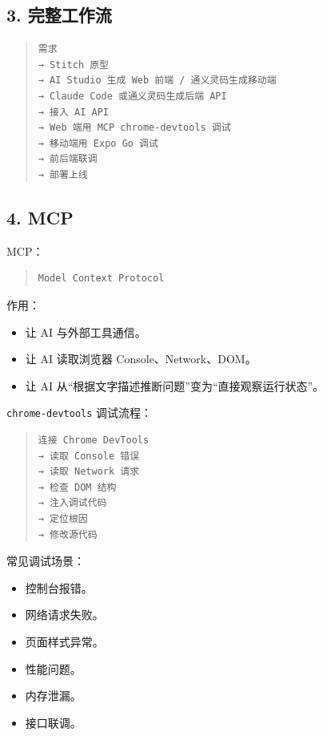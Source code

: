 \documentclass[UTF8,zihao=-4]{ctexart}
\begin{document}
\subsection{3. 完整工作流}

\begin{quote}
\footnotesize
\begin{verbatim}
需求
→ Stitch 原型
→ AI Studio 生成 Web 前端 / 通义灵码生成移动端
→ Claude Code 或通义灵码生成后端 API
→ 接入 AI API
→ Web 端用 MCP chrome-devtools 调试
→ 移动端用 Expo Go 调试
→ 前后端联调
→ 部署上线
\end{verbatim}
\end{quote}

\subsection{4. MCP}

MCP：

\begin{quote}
\footnotesize
\begin{verbatim}
Model Context Protocol
\end{verbatim}
\end{quote}

作用：

\begin{itemize}
\item 让 AI 与外部工具通信。
\item 让 AI 读取浏览器 Console、Network、DOM。
\item 让 AI 从“根据文字描述推断问题”变为“直接观察运行状态”。
\end{itemize}

\texttt{chrome-devtools} 调试流程：

\begin{quote}
\footnotesize
\begin{verbatim}
连接 Chrome DevTools
→ 读取 Console 错误
→ 读取 Network 请求
→ 检查 DOM 结构
→ 注入调试代码
→ 定位根因
→ 修改源代码
\end{verbatim}
\end{quote}

常见调试场景：

\begin{itemize}
\item 控制台报错。
\item 网络请求失败。
\item 页面样式异常。
\item 性能问题。
\item 内存泄漏。
\item 接口联调。
\end{itemize}
\end{document}
